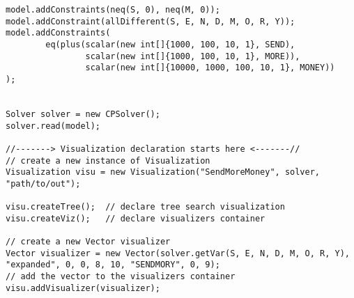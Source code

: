 \begin{lstlisting}[title=SendMoreMoney problem,captionpos=b]
model.addConstraints(neq(S, 0), neq(M, 0));                                                                      
model.addConstraint(allDifferent(S, E, N, D, M, O, R, Y));                                                       
model.addConstraints(                                                                                            
        eq(plus(scalar(new int[]{1000, 100, 10, 1}, SEND),                                                       
                scalar(new int[]{1000, 100, 10, 1}, MORE)),                                                      
                scalar(new int[]{10000, 1000, 100, 10, 1}, MONEY))                                               
);                                                                                                               
                                                                                                                 
                                                                                                                 
Solver solver = new CPSolver();                                                                                  
solver.read(model);                                                                                              
                                                                                                                 
//-------> Visualization declaration starts here <-------//                                                  
// create a new instance of Visualization                                                                        
Visualization visu = new Visualization("SendMoreMoney", solver, "path/to/out");                                   
                                                                                                                 
visu.createTree();  // declare tree search visualization                                                         
visu.createViz();   // declare visualizers container                                                             
                                                                                                                 
// create a new Vector visualizer                                                                                
Vector visualizer = new Vector(solver.getVar(S, E, N, D, M, O, R, Y), "expanded", 0, 0, 8, 10, "SENDMORY", 0, 9);
// add the vector to the visualizers container                                                                   
visu.addVisualizer(visualizer);                                                                                  
                                                                                                                 

\end{lstlisting}
